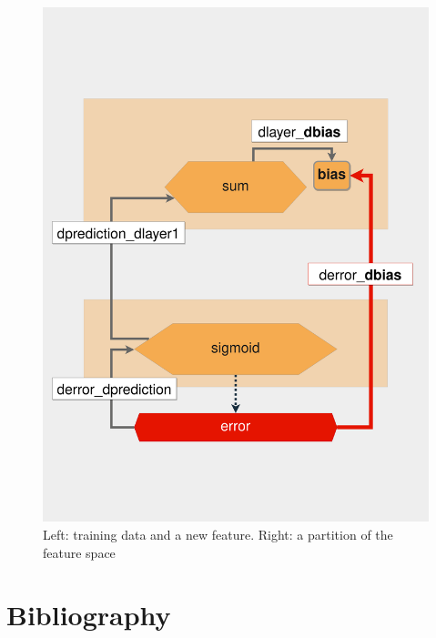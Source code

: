 \documentclass{beamer}
\begin{document}
\begin{frame}
    \begin{figure}
        \includegraphics[width=0.9\linewidth]{BiasGradient}
        \caption{Left: training data and a new feature. Right: a partition of the feature space\cite{kroese2020}}
        \label{Fig:BiasGradient}
    \end{figure}
\end{frame}



\section{Bibliography}


\end{document}
